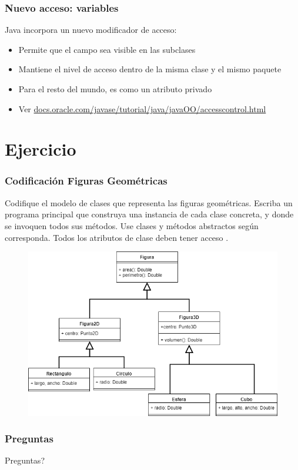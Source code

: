 \documentclass{beamer}
\begin{document}
\begin{frame}
  \frametitle{Nuevo acceso: variables }

  Java incorpora un nuevo modificador de acceso: 

  \begin{itemize}
  \item Permite que el campo sea visible en las subclases
    
  \item Mantiene el nivel de acceso dentro de la misma clase y el
    mismo paquete
    
  \item Para el resto del mundo, es como un atributo privado

  \item Ver \url{docs.oracle.com/javase/tutorial/java/javaOO/accesscontrol.html}
    
  \end{itemize}
  
\end{frame}

\section{Ejercicio}

\begin{frame}[fragile]
  \frametitle{Codificación Figuras Geométricas}

  \begin{small}
    Codifique el modelo de clases que representa las figuras
    geométricas. Escriba un programa principal que construya una
    instancia de cada clase concreta, y donde se invoquen todos sus
    métodos. Use clases y métodos abstractos según corresponda. Todos
    los atributos de clase deben tener acceso .
  \end{small}

  \begin{center}
  \begin{figure}
    \includegraphics[scale=0.35]{figures/Figuras.png}
  \end{figure}
  \end{center}

\end{frame}

\begin{frame}
  \frametitle{Preguntas}
  \hspace{4cm}\huge{Preguntas?}  
\end{frame}
\end{document}
